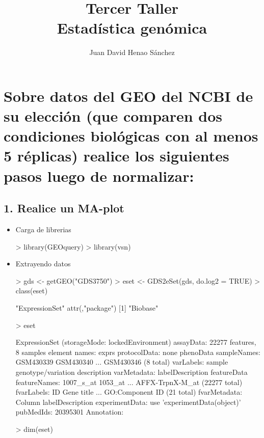 \documentclass[12pt]{article}
\title{Tercer Taller\\ Estadística genómica}
\author{Juan David Henao Sánchez}
\begin{document}


\maketitle

\section*{Sobre datos del GEO del NCBI de su elección (que comparen dos condiciones biológicas con al menos 5 réplicas) realice los siguientes pasos luego de normalizar:}
\subsection*{1. Realice un MA-plot}

\begin{itemize}
\item{Carga de librerias}
\begin{Schunk}
\begin{Sinput}
> library(GEOquery)
> library(vsn)
\end{Sinput}
\end{Schunk}
\item{Extrayendo datos}
\begin{Schunk}
\begin{Sinput}
> gds <- getGEO("GDS3750")
> eset <- GDS2eSet(gds, do.log2 = TRUE)
> class(eset)
\end{Sinput}
\begin{Soutput}
[1] "ExpressionSet"
attr(,"package")
[1] "Biobase"
\end{Soutput}
\begin{Sinput}
> eset
\end{Sinput}
\begin{Soutput}
ExpressionSet (storageMode: lockedEnvironment)
assayData: 22277 features, 8 samples 
  element names: exprs 
protocolData: none
phenoData
  sampleNames: GSM430339 GSM430340 ... GSM430346 (8 total)
  varLabels: sample genotype/variation description
  varMetadata: labelDescription
featureData
  featureNames: 1007_s_at 1053_at ... AFFX-TrpnX-M_at (22277 total)
  fvarLabels: ID Gene title ... GO:Component ID (21 total)
  fvarMetadata: Column labelDescription
experimentData: use 'experimentData(object)'
  pubMedIds: 20395301 
Annotation:  
\end{Soutput}
\begin{Sinput}
> dim(eset)
\end{Sinput}
\begin{Soutput}

\end{Soutput}
\end{Schunk}
\end{itemize}
\end{document}
